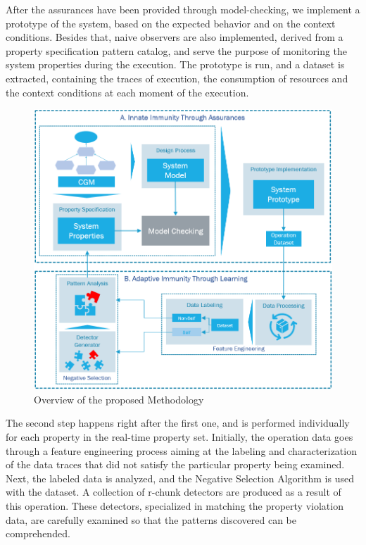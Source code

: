 After the assurances have been provided through model-checking, we implement a prototype of the system, based on the expected behavior and on the context conditions. Besides that, naive observers are also implemented, derived from a property specification pattern catalog, and serve the purpose of monitoring the system properties during the execution. The prototype is run, and a dataset is extracted, containing the traces of execution, the consumption of resources and the context conditions at each moment of the execution.

\begin{figure}[!h]
	\centering
	\includegraphics[width=0.999\textwidth, keepaspectratio]{img/overview_framework2.png}
	\caption{Overview of the proposed Methodology}
	\label{fig:FrameworkOverview}
\end{figure}

The second step happens right after the first one, and is performed individually for each property in the real-time property set. Initially, the operation data goes through a feature engineering process aiming at the labeling and characterization of the data traces that did not satisfy the particular property being examined. Next, the labeled data is analyzed, and  the Negative Selection Algorithm is used with the dataset. A collection of r-chunk detectors are produced as a result of this operation. These detectors, specialized in matching the property violation data, are carefully examined so that the patterns discovered can be comprehended. 

